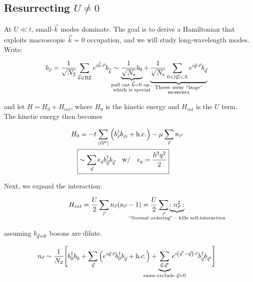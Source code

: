 \documentclass{article}
\newcommand{\egreg}{\vphantom{-}} %
\begin{document}
\subsection{Resurrecting $U\neq 0$}\label{Resurrecting }

At $U \ll t$, small-$\vec{k}$ modes dominate. The goal is to derive a Hamiltonian that exploits macroscopic $\vec{k} = 0$ occupation, and we will study long-wavelength modes. Write:

\begin{equation*}
    b_{\vec{r}}^{\egreg} = \dfrac{1}{\sqrt{N_2}} \sum_{\vec{k} \in \textrm{BZ}} e^{ i \vec{k}\cdot\vec{r}} b_{\vec{k}}^{\egreg} \sim \underbrace{\dfrac{1}{\sqrt{N_s}} b_0}_{\mathclap{\substack{\text{pull out } \vec{k} = 0 \text{ op.,} \\ \text{which is special}}}}
    + \underbrace{\dfrac{1}{\sqrt{N_s}} \sum_{0 < |\vec{q}| < \Lambda} e^{ i \vec{q}\cdot\vec{r}} b_{\vec{q}}^{\egreg}}_{\mathclap{\substack{\text{Throw away ``large''} \\ \text{momenta}}}}
\end{equation*}

and let $H = H_0 + H_{int}$, where $H_0$ is the kinetic energy and $H_{int}$ is the $U$ term. The kinetic energy then becomes

\begin{align*}
    H_0 &= -t \sum_{\expval{\vec{r} \vec{r}'}} \qty(b_{\vec{r}}^{\dagger} b_{\vec{r}\prime}^{\egreg} + \text{h.c.}) - \mu \sum_{\vec{r}} n_{\vec{r}}\\
    \Aboxed{&\sim \sum_{\vec{q}} \epsilon_q b_{\vec{q}}^{\dagger} b_{\vec{q}}^{\egreg} \qq{w/} \epsilon_q = \dfrac{\hbar^2 q^2}{2}}
\end{align*} 

Next, we expand the interaction:

\begin{equation*}
    H_{int} = \dfrac{U}{2} \sum_{\vec{r}} n_{\vec{r}} \qty(n_{\vec{r}} - 1) = \dfrac{U}{2} \sum_{\vec{r}} \underbrace{:n_{\vec{r}}^2:}_{\mathclap{\substack{\text{\egreg} \\ \text{``Normal ordering" -- kills self-interaction}}}}
\end{equation*}


assuming $b_{\vec{q}=0}^{\egreg}$ bosons are dilute.

\begin{equation*}
    n_{\vec{r}} \sim \dfrac{1}{N_2} \Biggr[
        b_{0}^{\dagger} b_0^{\egreg} + \sum_{\vec{q}} \qty(e^{ i \vec{q}\cdot\vec{r}} b_0^{\dagger} b_{\vec{q}}^{\egreg} + \text{h.c.})
        + \underbrace{\sum_{\vec{q}, \vec{q}'}}_{\mathclap{\substack{\text{sums exclude } \vec{q} = 0}}} e^{ i \qty(\vec{q}' - \vec{q})\cdot\vec{r}} b_{\vec{q}}^{\dagger} b_{\vec{q}'}^{\egreg}
    \Biggl]
\end{equation*}
\end{document}
